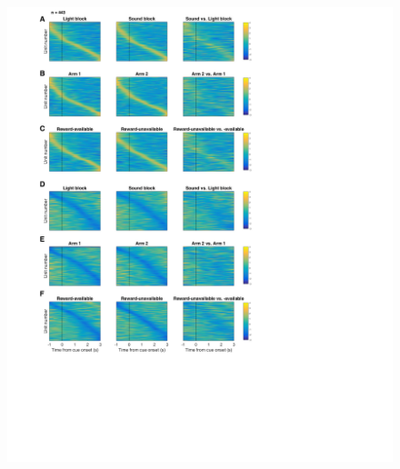 \documentclass[11pt]{article}
\begin{document}
\begin{figure}[h]
\centering
\includegraphics[height=0.5\textheight]{Fig 8 - Task tiling.png}

\end{figure}
\end{document}
